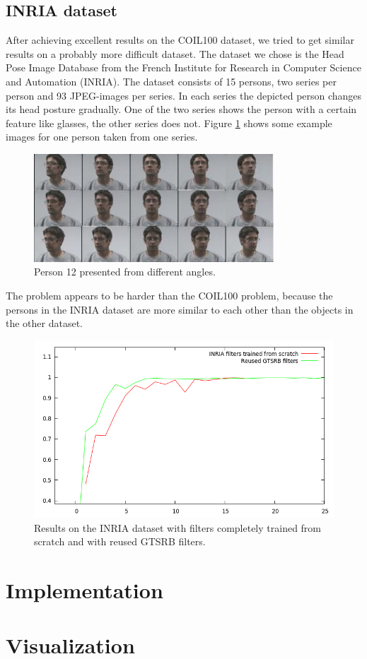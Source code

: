 \documentclass[11pt, a4paper]{article}
\begin{document}
\subsection{INRIA dataset}

After achieving excellent results on the COIL100 dataset, we tried to get similar results on a probably more difficult dataset. The dataset we chose is the Head Pose Image Database \cite{estimating-face-orientation-inria} from the French Institute for Research in Computer Science and Automation (INRIA). The dataset consists of 15 persons, two series per person and 93 JPEG-images per series. In each series the depicted person changes its head posture gradually. One of the two series shows the person with a certain feature like glasses, the other series does not. Figure \ref{fig:inria_different_angles} shows some example images for one person taken from one series.

\begin{figure}[h!]
	\centering
	\includegraphics[width=0.8\textwidth]{inria_different_angles}
	\caption{Person 12 presented from different angles.}
	\label{fig:inria_different_angles}
\end{figure}

The problem appears to be harder than the COIL100 problem, because the persons in the INRIA dataset are more similar to each other than the objects in the other dataset.

\begin{figure}[h!]
	\centering
	\includegraphics[width=1\textwidth]{inria_results.png}
	\caption{Results on the INRIA dataset with filters completely trained from scratch and with reused GTSRB filters.}
	\label{fig:inria_results}
\end{figure}

\begin{appendix}
	\section{Implementation}
	\section{Visualization}
\end{appendix}

{}

\end{document}
